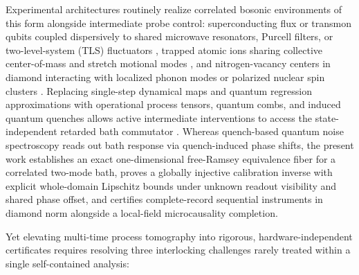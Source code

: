 \documentclass[11pt,letterpaper]{article}
\theoremstyle{definition}
\begin{document}
Experimental architectures routinely realize correlated bosonic
environments of this form alongside intermediate probe control:
superconducting flux or transmon qubits coupled dispersively to shared
microwave resonators, Purcell filters, or two-level-system (TLS)
fluctuators \citep{bylander2011, vonLupke2020, white2020}, trapped
atomic ions sharing collective center-of-mass and stretch motional modes
\citep{biercuk2009, kotler2011}, and nitrogen-vacancy centers in diamond
interacting with localized phonon modes or polarized nuclear spin
clusters \citep{degen2017, haase2018, kwiatkowski2020}. Replacing
single-step dynamical maps
\citep{davies1974, gorini1976, lindblad1976, kraus1983} and quantum
regression approximations \citep{guarnieri2014} with operational process
tensors, quantum combs, and induced quantum quenches
\citep{chiribella2009, gutoskiWatrous2007, oreshkov2012, costaShrapnel2016, pollock2018pra, pollock2018prl, taranto2019, figueroaRomero2019, milzModi2021, white2020, wangClerk2021, white2022}
allows active intermediate interventions to access the state-independent
retarded bath commutator \citep{chin2012, giovannetti2011, haase2018}.
Whereas quench-based quantum noise spectroscopy \citep{wangClerk2021}
reads out bath response via quench-induced phase shifts, the present
work establishes an exact one-dimensional free-Ramsey equivalence fiber
for a correlated two-mode bath, proves a globally injective calibration
inverse with explicit whole-domain Lipschitz bounds under unknown
readout visibility and shared phase offset, and certifies
complete-record sequential instruments in diamond norm alongside a
local-field microcausality completion.

Yet elevating multi-time process tomography into rigorous,
hardware-independent certificates requires resolving three interlocking
challenges rarely treated within a single self-contained analysis:
\end{document}
